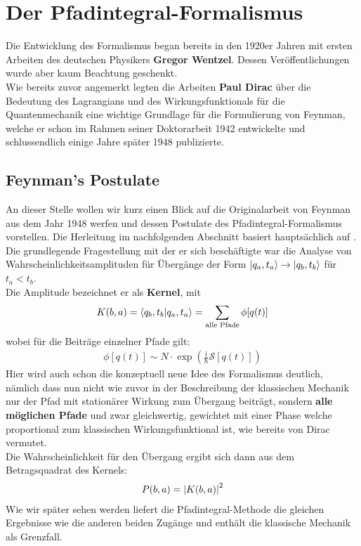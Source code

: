 \section{Der Pfadintegral-Formalismus}
Die Entwicklung des Formalismus began bereits in den 1920er Jahren mit ersten Arbeiten des deutschen Physikers \textbf{Gregor Wentzel}. Dessen Veröffentlichungen wurde aber kaum Beachtung geschenkt. \\
Wie bereits zuvor angemerkt legten die Arbeiten \textbf{Paul Dirac} über die Bedeutung des Lagrangians und des Wirkungsfunktionals für die Quantenmechanik eine wichtige Grundlage für die Formulierung von Feynman, welche er schon im Rahmen seiner Doktorarbeit 1942 entwickelte und schlussendlich einige Jahre später 1948 publizierte. 

\subsection{Feynman's Postulate}
An dieser Stelle wollen wir kurz einen Blick auf die Originalarbeit \cite{Feynman1948} von Feynman aus dem Jahr 1948 werfen und dessen Postulate des Pfadintegral-Formalismus vorstellen. Die Herleitung im nachfolgenden Abschnitt basiert hauptsächlich auf \cite{WeigandQFT2014}. \\
Die grundlegende Fragestellung mit der er sich beschäftigte war  die Analyse von Wahrscheinlichkeitsamplituden für Übergänge der Form $\ket{q_a,t_a}\rightarrow\ket{q_b,t_b}$ für $t_a<t_b$. \\
Die Amplitude bezeichnet er als \textbf{Kernel}, mit
\begin{align}
		K(b,a) = \braket{q_b,t_b}{q_a,t_a} 
			   = \sum_{\text{alle Pfade}}\phi[q(t)]
\end{align}
wobei für die Beiträge einzelner Pfade gilt:
\begin{align}
		\phi[q(t)] \sim N \cdot \exp\left(\frac{\mathrm{i}}{\hbar}\mathcal{S}[q(t)]\right) 
\end{align} 	
Hier wird auch schon die konzeptuell neue Idee des Formalismus deutlich, nämlich dass nun nicht wie zuvor in der Beschreibung der klassischen Mechanik nur der Pfad mit stationärer Wirkung zum Übergang beiträgt, sondern \textbf{alle möglichen Pfade} und zwar gleichwertig, gewichtet mit einer Phase welche proportional zum klassischen Wirkungsfunktional ist, wie bereits von Dirac vermutet. \\
Die Wahrscheinlichkeit für den Übergang ergibt sich dann aus dem Betragsquadrat des Kernels:
\begin{align}
	 P(b,a) = \abs{K(b,a)}^2 
\end{align}
Wie wir später sehen werden liefert die Pfadintegral-Methode die gleichen Ergebnisse wie die anderen beiden Zugänge und enthält die klassische Mechanik als Grenzfall.
